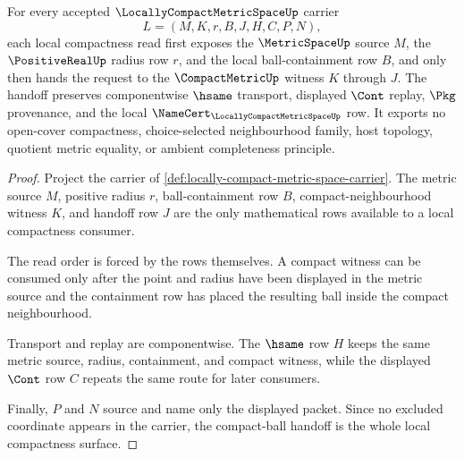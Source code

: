\begin{theorem}
\label{thm:locally-compact-metric-space-compact-ball-handoff}
For every accepted $\LocallyCompactMetricSpaceUp$ carrier
$$
L=(M,K,r,B,J,H,C,P,N),
$$
each local compactness read first exposes the $\MetricSpaceUp$ source $M$, the $\PositiveRealUp$ radius row $r$, and the local ball-containment row $B$, and only then hands the request to the $\CompactMetricUp$ witness $K$ through $J$. The handoff preserves componentwise $\hsame$ transport, displayed $\Cont$ replay, $\Pkg$ provenance, and the local $\NameCert_{\LocallyCompactMetricSpaceUp}$ row. It exports no open-cover compactness, choice-selected neighbourhood family, host topology, quotient metric equality, or ambient completeness principle.
\end{theorem}
\begin{proof}
Project the carrier of \autoref{def:locally-compact-metric-space-carrier}. The metric source $M$, positive radius $r$, ball-containment row $B$, compact-neighbourhood witness $K$, and handoff row $J$ are the only mathematical rows available to a local compactness consumer.

The read order is forced by the rows themselves. A compact witness can be consumed only after the point and radius have been displayed in the metric source and the containment row has placed the resulting ball inside the compact neighbourhood.

Transport and replay are componentwise. The $\hsame$ row $H$ keeps the same metric source, radius, containment, and compact witness, while the displayed $\Cont$ row $C$ repeats the same route for later consumers.

Finally, $P$ and $N$ source and name only the displayed packet. Since no excluded coordinate appears in the carrier, the compact-ball handoff is the whole local compactness surface.
\end{proof}

